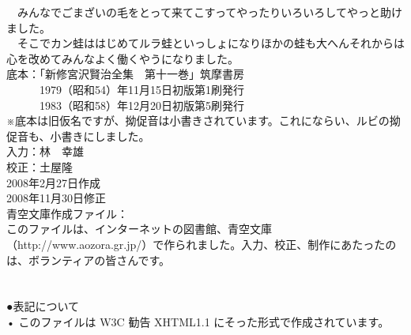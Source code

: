 \documentclass[
a4paper,
book]
{tarticle}
\begin{document}
　みんなでごまざいの毛をとって来てこすってやったりいろいろしてやっと助けました。\\
　そこでカン蛙ははじめてルラ蛙といっしょになりほかの蛙も大へんそれからは心を改めてみんなよく働くやうになりました。\\
\newpage
底本：「新修宮沢賢治全集　第十一巻」筑摩書房\\
　　　1979（昭和54）年11月15日初版第1刷発行\\
　　　1983（昭和58）年12月20日初版第5刷発行\\
※底本は旧仮名ですが、拗促音は小書きされています。これにならい、ルビの拗促音も、小書きにしました。\\
入力：林　幸雄\\
校正：土屋隆\\
2008年2月27日作成\\
2008年11月30日修正\\
青空文庫作成ファイル：\\
このファイルは、インターネットの図書館、青空文庫（http://www.aozora.gr.jp/）で作られました。入力、校正、制作にあたったのは、ボランティアの皆さんです。\\
\\
\\
●表記について\\
•	このファイルは W3C 勧告 XHTML1.1 にそった形式で作成されています。\\
\\
\begin{comment}
a
\end{comment}
\end{document}
